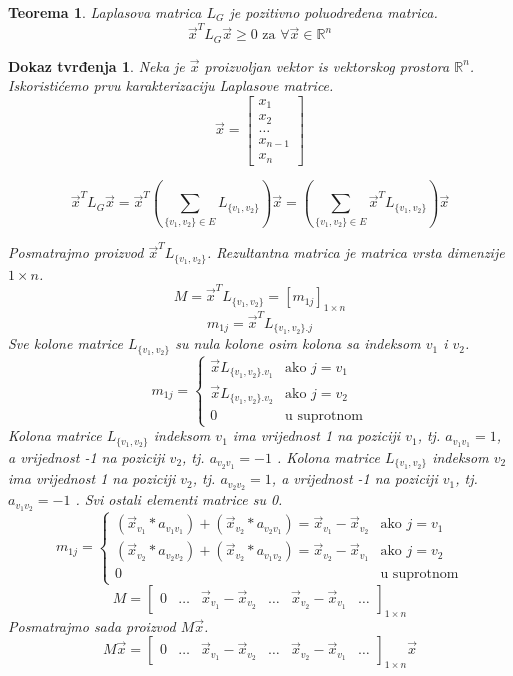\documentclass[11pt]{article}
\newtheorem{theorem}{Teorema}
\newtheorem*{custom_proof}{Dokaz tvrđenja}
\begin{document}
	\begin{theorem} Laplasova matrica $L_G$ je pozitivno poluodređena matrica. 
	\[
	  \vec{x}^TL_G\vec{x} \geq 0 \text{ za } \forall \vec{x} \in \mathbb{R}^n
	\] 
	\end{theorem}
	\begin{custom_proof}
	Neka je $\vec{x}$ proizvoljan vektor is vektorskog prostora $\mathbb{R}^n$. Iskoristićemo prvu karakterizaciju Laplasove matrice.
	\[
	\vec{x} = 
	\begin{bmatrix} 
	x_1 \\ x_2 \\ \dots \\ x_{n-1} \\ x_n
	\end{bmatrix}
	\]

	\[
	  \vec{x}^TL_G\vec{x} = \vec{x}^T (\sum_{\{v_1,v_2\} \in E} L_{\{v_1,v_2\}}) \vec{x}  =  (\sum_{\{v_1,v_2\} \in E} \vec{x}^TL_{\{v_1,v_2\}}) \vec{x}
	\]
	
	Posmatrajmo proizvod $\vec{x}^T L_{\{v_1,v_2\}}$. Rezultantna matrica je matrica vrsta dimenzije $1 \times n$.
	\[
	M = \vec{x}^T L_{\{v_1,v_2\}} = [m_{1j}]_{1 \times n}
	\]
	\[
	m_{1j} = \vec{x}^T L_{\{v_1,v_2\} . j}
	\]
	Sve kolone matrice $L_{\{v_1,v_2\}}$ su nula kolone osim kolona sa indeksom $v_1$ i $v_2$.
	\[
	 m_{1j} =
	 \begin{cases}
	 \vec{x} L_{\{v_1,v_2\} . v_1}  & \text{ako } j = v_1 \\ 
	 \vec{x} L_{\{v_1,v_2\} . v_2}  & \text{ako } j = v_2  \\ 
	 0  & \text{u suprotnom}
	 \end{cases}
	\]
	Kolona matrice $L_{\{v_1,v_2\}}$ indeksom $v_1$ ima vrijednost 1 na poziciji $v_1$, tj. $a_{v_1 v_1} = 1$, a vrijednost -1 na poziciji $v_2$, tj. $a_{v_2 v_1} = -1$ .
	Kolona matrice $L_{\{v_1,v_2\}}$ indeksom $v_2$ ima vrijednost 1 na poziciji $v_2$, tj. $a_{v_2 v_2} = 1$, a vrijednost -1 na poziciji $v_1$, tj. $a_{v_1 v_2} = -1$ .
	Svi ostali elementi matrice su 0.
	\[
	 m_{1j} =
	 \begin{cases}
	 (\vec{x}_{v_1} * a_{v_1 v_1}) + (\vec{x}_{v_2} * a_{v_2 v_1}) = \vec{x}_{v_1} - \vec{x}_{v_2}   & \text{ako } j = v_1 \\ 
	 (\vec{x}_{v_2} * a_{v_2 v_2}) + (\vec{x}_{v_2} * a_{v_1 v_2}) = \vec{x}_{v_2} - \vec{x}_{v_1}  & \text{ako } j = v_2  \\ 
	 0  & \text{u suprotnom}
	 \end{cases}
	\]
	\[
	M = 
	\begin{bmatrix} 
	0 & \dots &  \vec{x}_{v_1} - \vec{x}_{v_2} & \dots &  \vec{x}_{v_2} - \vec{x}_{v_1} & \dots
	\end{bmatrix}
	_{1 \times n}
	\]
	Posmatrajmo sada proizvod $M \vec{x}$.
	\[
	  M \vec{x} =\begin{bmatrix} 
	0 & \dots &  \vec{x}_{v_1} - \vec{x}_{v_2} & \dots &  \vec{x}_{v_2} - \vec{x}_{v_1} & \dots
	\end{bmatrix}
	_{1 \times n} \vec{x}  
	\]
	

\end{custom_proof}
\end{document}

